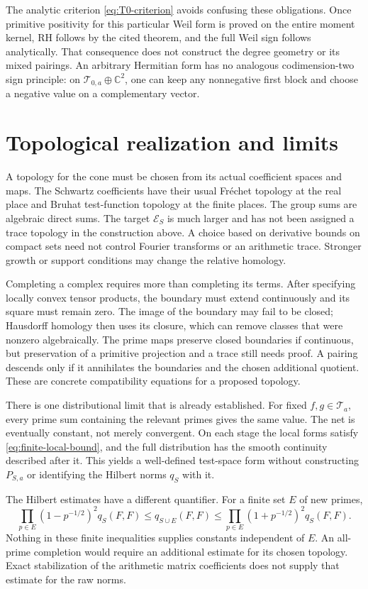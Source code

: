 \documentclass[11pt,letterpaper]{article}
\theoremstyle{definition}
\theoremstyle{remark}
\newcommand{\C}{\mathbb C}
\newcommand{\T}{\mathcal T}
\begin{document}
The analytic criterion \eqref{eq:T0-criterion} avoids confusing
these obligations. Once primitive positivity for this particular
Weil form is proved on the entire moment kernel, RH follows by
the cited theorem, and the full Weil sign follows analytically.
That consequence does not construct the degree geometry or its
mixed pairings. An arbitrary Hermitian form has no analogous
codimension-two sign principle: on $\T_{0,a}\oplus\C^2$, one
can keep any nonnegative first block and choose a negative value
on a complementary vector.

\section{Topological realization and limits}

A topology for the cone must be chosen from its actual coefficient
spaces and maps. The Schwartz coefficients have their usual
Fr\'echet topology at the real place and Bruhat test-function
topology at the finite places. The group sums are algebraic
direct sums. The target $\mathscr E_S$ is much larger and has
not been assigned a trace topology in the construction above.
A choice based on derivative bounds on compact sets need not
control Fourier transforms or an arithmetic trace. Stronger
growth or support conditions may change the relative homology.

Completing a complex requires more than completing its terms.
After specifying locally convex tensor products, the boundary
must extend continuously and its square must remain zero.
The image of the boundary may fail to be closed; Hausdorff
homology then uses its closure, which can remove classes that
were nonzero algebraically. The prime maps preserve closed
boundaries if continuous, but preservation of a primitive
projection and a trace still needs proof. A pairing descends
only if it annihilates the boundaries and the chosen additional
quotient. These are concrete compatibility equations for a
proposed topology.

There is one distributional limit that is already established.
For fixed $f,g\in\T_a$, every prime sum containing the relevant
primes gives the same value. The net is eventually constant,
not merely convergent. On each stage the local forms satisfy
\eqref{eq:finite-local-bound}, and the full distribution has the
smooth continuity described after it. This yields a well-defined
test-space form without constructing $P_{S,a}$ or identifying
the Hilbert norms $q_S$ with it.

The Hilbert estimates have a different quantifier. For a finite
set $E$ of new primes,
\begin{equation}
 \prod_{p\in E}(1-p^{-1/2})^2q_S(F,F)
 \le q_{S\cup E}(F,F)
 \le\prod_{p\in E}(1+p^{-1/2})^2q_S(F,F).
 \label{eq:product-bounds}
\end{equation}
Nothing in these finite inequalities supplies constants
independent of $E$. An all-prime completion would require an
additional estimate for its chosen topology. Exact stabilization
of the arithmetic matrix coefficients does not supply that
estimate for the raw norms.
\end{document}
